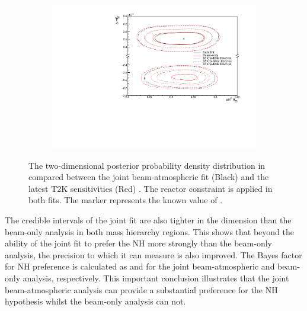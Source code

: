 \begin{figure}[h]
  \begin{subfigure}[t]{0.98\textwidth}
    \includegraphics[width=\textwidth, trim={0mm 0mm 0mm 0mm}, clip,page=1]{Figures/OA/JointFit_OA2020_wRC_Comp/ContourComparison_2D_th23_dm32_BH_1_wRC_UnSmeared_CredibleInterval.pdf}
  \end{subfigure}
  \caption{The two-dimensional posterior probability density distribution in  compared between the joint beam-atmospheric fit (Black) and the latest T2K sensitivities (Red) \cite{Dunne2020-uf, t2k_tn_393}. The reactor constraint is applied in both fits. The marker represents the known value of .}
  \label{fig:OscillationAnalysis_JointFit_OA2020_wRC_TH23DM32}
\end{figure}

The credible intervals of the joint fit are also tighter in the  dimension than the beam-only analysis in both mass hierarchy regions. This shows that beyond the ability of the joint fit to prefer the NH more strongly than the beam-only analysis, the precision to which it can measure  is also improved. The Bayes factor for NH preference is calculated as  and  for the joint beam-atmospheric and beam-only analysis, respectively. This important conclusion illustrates that the joint beam-atmospheric analysis can provide a substantial preference for the NH hypothesis whilst the beam-only analysis can not.

